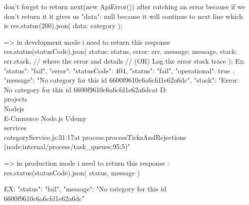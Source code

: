                     don't forget to return next(new ApiError()) after catching an error
                    because if we don't return it it gives us {"data": null}
                    because it will continue to next line which is   res.status(200).json({ data: category });

  => in development mode i need to return this response 
                                                        res.status(statusCode).json({
                                                            status: status,
                                                            error: err,
                                                            message: message,
                                                            stack: err.stack, // where the error and details // (OR) Log the error stack trace
                                                        });  
                                                    Ex:  {
                                                            "status": "fail",
                                                            "error": {
                                                                "statusCode": 404,
                                                                "status": "fail",
                                                                "operational": true
                                                            },
                                                            "message": "No category for this id 6600f9610c6a6cfd1e62a6dc",
                                                            "stack": "Error: No category for this id 6600f9610c6a6cfd1e62a6dc\n    at D:\\projects\\Nodejs\\E-Cmmerce Node.js Udemy\\services\\categoryService.js:31:17\n    at process.processTicksAndRejections (node:internal/process/task_queues:95:5)"
                                                        }

    
  => in production mode i need to return this response : 
                                   res.status(statusCode).json({
                                       status,
                                       message
                                   })

                                   EX: {
                                            "status": "fail",
                                            "message": "No category for this id 6600f9610c6a6cfd1e62a6dc"
                                        }

